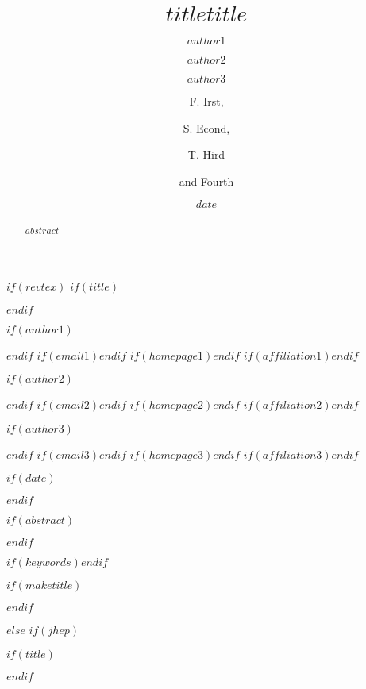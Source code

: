 \documentclass[$if(fontsize)$$fontsize$,$endif$$if(lang)$$lang$,$endif$$if(papersize)$$papersize$,$endif$$for(classoption)$$classoption$$sep$,$endfor$]{$documentclass$}
\begin{document}


$if(revtex)$
$if(title)$\title{$title$}$endif$

$if(author1)$\author{$author1$}$endif$
$if(email1)$$endif$
$if(homepage1)$$endif$
$if(affiliation1)$$endif$

$if(author2)$\author{$author2$}$endif$
$if(email2)$$endif$
$if(homepage2)$$endif$
$if(affiliation2)$$endif$

$if(author3)$\author{$author3$}$endif$
$if(email3)$$endif$
$if(homepage3)$$endif$
$if(affiliation3)$$endif$

$if(date)$\date{$date$}$endif$

$if(abstract)$
\begin{abstract}
$abstract$
\end{abstract}
$endif$

$if(keywords)$$endif$

$if(maketitle)$\maketitle$endif$

$else$
$if(jhep)$

$if(title)$\title{\boldmath $title$}$endif$



\author[a,b,1]{F. Irst,}
\author[c]{S. Econd,}
\author[a,2]{T. Hird}
\author[a,2]{and Fourth}
\end{document}
